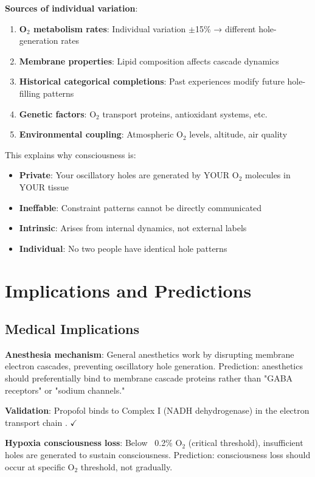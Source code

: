 \documentclass[11pt,a4paper]{article}
\begin{document}
\textbf{Sources of individual variation}:
\begin{enumerate}
\item \textbf{O$_2$ metabolism rates}: Individual variation $\pm$15\% → different hole-generation rates
\item \textbf{Membrane properties}: Lipid composition affects cascade dynamics
\item \textbf{Historical categorical completions}: Past experiences modify future hole-filling patterns
\item \textbf{Genetic factors}: O$_2$ transport proteins, antioxidant systems, etc.
\item \textbf{Environmental coupling}: Atmospheric O$_2$ levels, altitude, air quality
\end{enumerate}

This explains why consciousness is:
\begin{itemize}
\item \textbf{Private}: Your oscillatory holes are generated by YOUR O$_2$ molecules in YOUR tissue
\item \textbf{Ineffable}: Constraint patterns cannot be directly communicated
\item \textbf{Intrinsic}: Arises from internal dynamics, not external labels
\item \textbf{Individual}: No two people have identical hole patterns
\end{itemize}

\section{Implications and Predictions}

\subsection{Medical Implications}

\textbf{Anesthesia mechanism}: General anesthetics work by disrupting membrane electron cascades, preventing oscillatory hole generation. Prediction: anesthetics should preferentially bind to membrane cascade proteins rather than "GABA receptors" or "sodium channels."

\textbf{Validation}: Propofol binds to Complex I (NADH dehydrogenase) in the electron transport chain \cite{branca2014propofol}. $\checkmark$

\textbf{Hypoxia consciousness loss}: Below ~0.2\% O$_2$ (critical threshold), insufficient holes are generated to sustain consciousness. Prediction: consciousness loss should occur at specific O$_2$ threshold, not gradually.
\end{document}
